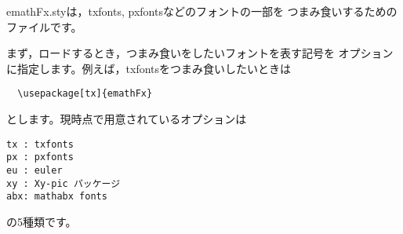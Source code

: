 \documentclass[disablejfam,a4j]{jarticle}
\begin{document}
\textsf{emathFx.sty}は，\textsf{txfonts, pxfonts}などのフォントの一部を
つまみ食いするためのファイルです。

まず，ロードするとき，つまみ食いをしたいフォントを表す記号を
オプションに指定します。例えば，\textsf{txfonts}をつまみ食いしたいときは
\begin{jquote}
\begin{verbatim}
  \usepackage[tx]{emathFx}
\end{verbatim}
\end{jquote}
とします。現時点で用意されているオプションは
\begin{jquote}
\begin{verbatim}
tx : txfonts
px : pxfonts
eu : euler
xy : Xy-pic パッケージ
abx: mathabx fonts
\end{verbatim}
\end{jquote}
の5種類です。
\clearpage
\end{document}
